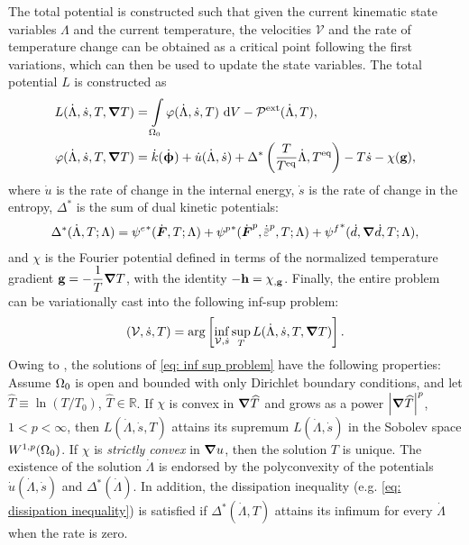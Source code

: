 The total potential is constructed such that given the current kinematic state variables $\Lambda$ and the current temperature, the velocities $\mathcal{V}$ and the rate of temperature change can be obtained as a critical point following the first variations, which can then be used to update the state variables. The total potential $L$ is constructed as
\begin{subequations}
  \begin{align}
    L(\dot{\Lambda}, \dot{s}, T, \boldsymbol{\nabla} T)       & = \int\limits_{\Omega_0} \varphi(\dot{\Lambda}, \dot{s}, T) \text{ d}V - \mathcal{P}^\text{ext}(\dot{\Lambda}, T), \label{eq: total potential 1}                                             \\
    \varphi(\dot{\Lambda}, \dot{s}, T, \boldsymbol{\nabla} T) & = \dot{k}(\dot{\boldsymbol{\upphi}}) + \dot{u}(\dot{\Lambda}, \dot{s}) + \Delta^*\left( \dfrac{T}{T^\text{eq}}\dot{\Lambda}, T^\text{eq} \right) - T\dot{s} - \chi(\textbf{g}), \label{eq: local energy density} 
  \end{align}
\end{subequations}
where $\dot{u}$ is the rate of change in the internal energy, $\dot{s}$ is the rate of change in the entropy, $\Delta^*$ is the sum of dual kinetic potentials:
\begin{align}
  \Delta^*(\dot{\Lambda}, T; \Lambda) = {\psi^e}^*(\dot{\defgrad}, T; \Lambda) + {\psi^p}^*(\dot{\defgrad}^p, \epdot, T; \Lambda) + {\psi^f}^*(\dot{d}, \grad \dot{d}, T; \Lambda), \label{eq: dual kinetic potentials}
\end{align}
and $\chi$ is the Fourier potential defined in terms of  the normalized temperature gradient $\textbf{g} = -\dfrac{1}{T}\boldsymbol{\nabla} T$, with the identity $-\textbf{h} = \chi_{,\textbf{g}}$.
Finally, the entire problem can be variationally cast into the following inf-sup problem:
\begin{align}
  \left( \mathcal{V}, \dot{s}, T \right) = \arg \left[ \inf_{\mathcal{V}, \dot{s}} \sup_T L(\dot{\Lambda}, \dot{s}, T, \boldsymbol{\nabla} T) \right]. \label{eq: inf sup problem}
\end{align}
Owing to \cite{dal2012introduction,yang2006variational}, the solutions of \eqref{eq: inf sup problem} have the following properties: Assume $\Omega_0$ is open and bounded with only Dirichlet boundary conditions, and let $\widehat{T} \equiv \ln(T/T_0)$, $\widehat{T} \in \mathbb{R}$.
If $\chi$ is convex in $\boldsymbol{\nabla} \widehat{T}$ and grows as a power $\left\vert{\boldsymbol{\nabla}\widehat{T}}\right\vert^p$, $1 < p < \infty$, then $L(\dot{\Lambda}, \dot{s}, T)$ attains its supremum $L(\dot{\Lambda}, \dot{s})$ in the Sobolev space $W^{1,p}(\Omega_0)$.
If $\chi$ is \emph{strictly convex} in $\boldsymbol{\nabla} u$, then the solution $T$ is unique. The existence of the solution $\dot{\Lambda}$ is endorsed by the polyconvexity of the potentials $\dot{u}(\dot{\Lambda}, \dot{s})$ and $\Delta^*(\dot{\Lambda})$.
In addition, the dissipation inequality (e.g. \eqref{eq: dissipation inequality}) is satisfied if $\Delta^*(\dot{\Lambda}, T)$ attains its infimum for every $\dot{\Lambda}$ when the rate is zero.

